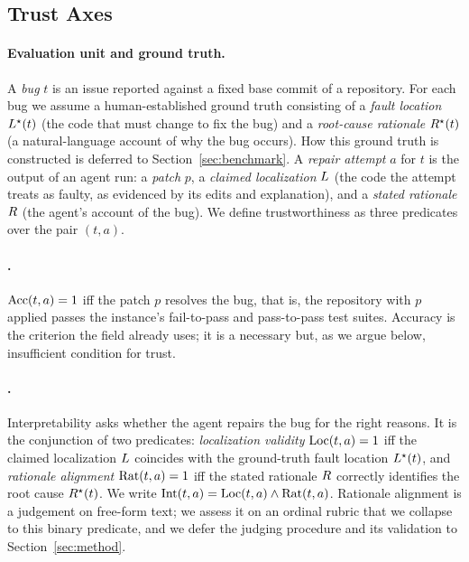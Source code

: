 \subsection{Trust Axes}
\label{subsec:axes}

\paragraph{Evaluation unit and ground truth.}
A \emph{bug} $t$ is an issue reported against a fixed base commit of a repository. For each
bug we assume a human-established ground truth consisting of a \emph{fault location}
$L^{\star}(t)$ (the code that must change to fix the bug) and a \emph{root-cause
rationale} $R^{\star}(t)$ (a natural-language account of why the bug occurs). How this
ground truth is constructed is deferred to Section~\ref{sec:benchmark}. A \emph{repair
attempt} $a$ for $t$ is the output of an agent run: a \emph{patch} $p$, a \emph{claimed
localization} $L$ (the code the attempt treats as faulty, as evidenced by its edits and
explanation), and a \emph{stated rationale} $R$ (the agent's account of the bug). We
define trustworthiness as three predicates over the pair $(t, a)$.

\paragraph{\accuracy{}.}
$\mathrm{Acc}(t, a) = 1$ iff the patch $p$ resolves the bug, that is, the repository with $p$
applied passes the instance's fail-to-pass and pass-to-pass test suites. Accuracy is the
criterion the field already uses; it is a necessary but, as we argue below, insufficient
condition for trust.

\paragraph{\interpretability{}.}
Interpretability asks whether the agent repairs the bug for the right reasons. It is the
conjunction of two predicates:
\emph{localization validity} $\mathrm{Loc}(t, a) = 1$ iff the claimed localization $L$ coincides
with the ground-truth fault location $L^{\star}(t)$, and
\emph{rationale alignment} $\mathrm{Rat}(t, a) = 1$ iff the stated rationale $R$ correctly
identifies the root cause $R^{\star}(t)$.
We write $\mathrm{Int}(t, a) = \mathrm{Loc}(t, a) \wedge \mathrm{Rat}(t, a)$. Rationale alignment is a judgement on
free-form text; we assess it on an ordinal rubric that we collapse to this binary predicate,
and we defer the judging procedure and its validation to Section~\ref{sec:method}.

